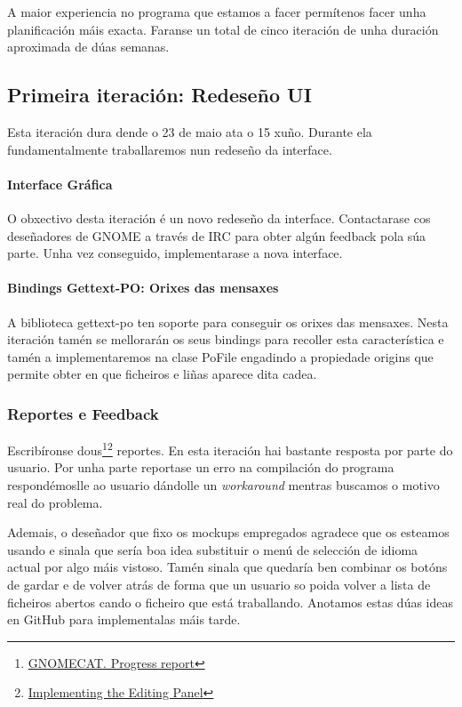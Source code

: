 A maior experiencia no programa que estamos a facer permítenos facer unha planificación máis exacta. Faranse un total de cinco iteración de unha duración aproximada de dúas semanas.

\subsection{Primeira iteración: Redeseño UI}

Esta iteración dura dende o 23 de maio ata o 15 xuño. Durante ela fundamentalmente traballaremos nun redeseño da interface.

\paragraph{Interface Gráfica} O obxectivo desta iteración é un novo redeseño da interface. Contactarase cos deseñadores de GNOME a través de IRC para obter algún feedback pola súa parte. Unha vez conseguido, implementarase a nova interface.

\paragraph{Bindings Gettext-PO: Orixes das mensaxes}
A biblioteca gettext-po ten soporte para conseguir os orixes das mensaxes. Nesta iteración tamén se mellorarán os seus bindings para recoller esta característica e tamén a implementaremos na clase PoFile engadindo a propiedade origins que permite obter en que ficheiros e liñas aparece dita cadea.

\subsubsection{Reportes e Feedback}
Escribíronse dous\footnote{\href{http://aquelando.info/gnomecat-progress-report/}{GNOMECAT. Progress report}}\footnote{\href{http://aquelando.info/implementing-the-editing-panel/}{Implementing the Editing Panel}} reportes. En esta iteración hai bastante resposta por parte do usuario. Por unha parte reportase un erro na compilación do programa respondémoslle ao usuario dándolle un \emph{workaround} mentras buscamos o motivo real do problema.

Ademais, o deseñador que fixo os mockups empregados agradece que os esteamos usando e sinala que sería boa idea substituir o menú de selección de idioma actual por algo máis vistoso. Tamén sinala que quedaría ben combinar os botóns de gardar e de volver atrás de forma que un usuario so poida volver a lista de ficheiros abertos cando o ficheiro que está traballando. Anotamos estas dúas ideas en GitHub para implementalas máis tarde.

